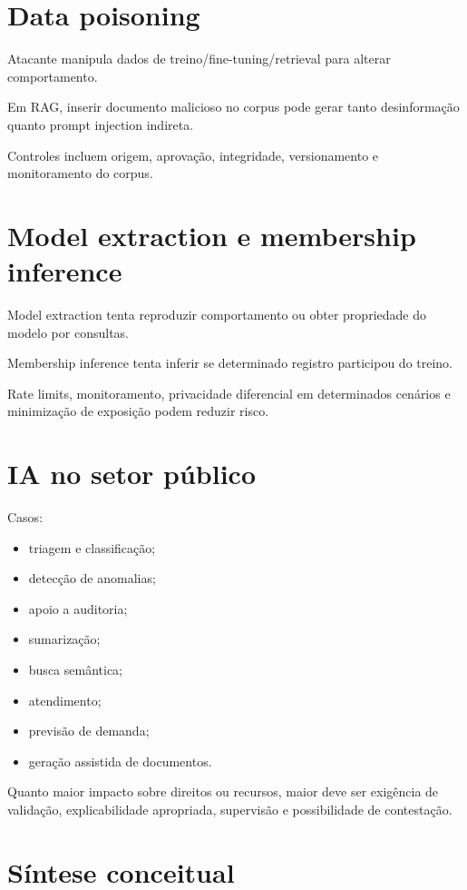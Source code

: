 \section{Data poisoning}

Atacante manipula dados de treino/fine-tuning/retrieval para alterar comportamento.

Em RAG, inserir documento malicioso no corpus pode gerar tanto desinformação quanto prompt injection indireta.

Controles incluem origem, aprovação, integridade, versionamento e monitoramento do corpus.

\section{Model extraction e membership inference}

Model extraction tenta reproduzir comportamento ou obter propriedade do modelo por consultas.

Membership inference tenta inferir se determinado registro participou do treino.

Rate limits, monitoramento, privacidade diferencial em determinados cenários e minimização de exposição podem reduzir risco.

\section{IA no setor público}

Casos:
\begin{itemize}
\item triagem e classificação;
\item detecção de anomalias;
\item apoio a auditoria;
\item sumarização;
\item busca semântica;
\item atendimento;
\item previsão de demanda;
\item geração assistida de documentos.
\end{itemize}

Quanto maior impacto sobre direitos ou recursos, maior deve ser exigência de validação, explicabilidade apropriada, supervisão e possibilidade de contestação.

\section{Síntese conceitual}

